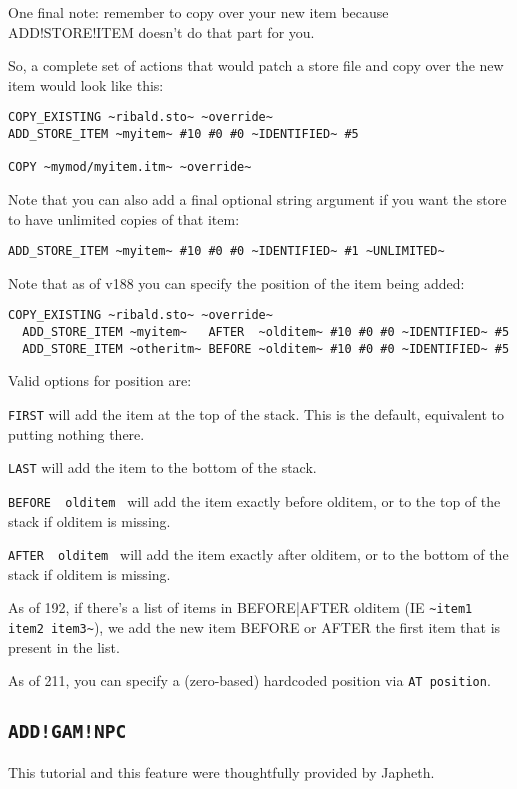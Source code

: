 \documentclass{article}
\def\DEFINE#1{{\tt \bf #1}\label{#1}\index{#1}}
\def\t#1{{\tt #1}}
\begin{document}
  One final note: remember to copy over your new item because
  ADD!STORE!ITEM doesn't do that part for you.

  So, a complete set of actions that would patch a store file and copy over
  the new item would look like this:

\begin{verbatim}
COPY_EXISTING ~ribald.sto~ ~override~
ADD_STORE_ITEM ~myitem~ #10 #0 #0 ~IDENTIFIED~ #5

COPY ~mymod/myitem.itm~ ~override~
\end{verbatim}

  Note that you can also add a final optional string argument if you want
  the store to have unlimited copies of that item:

\begin{verbatim}
ADD_STORE_ITEM ~myitem~ #10 #0 #0 ~IDENTIFIED~ #1 ~UNLIMITED~
\end{verbatim}

Note that as of v188 you can specify the position of the item being added:
\begin{verbatim}
COPY_EXISTING ~ribald.sto~ ~override~
  ADD_STORE_ITEM ~myitem~   AFTER  ~olditem~ #10 #0 #0 ~IDENTIFIED~ #5
  ADD_STORE_ITEM ~otheritm~ BEFORE ~olditem~ #10 #0 #0 ~IDENTIFIED~ #5
\end{verbatim}
  Valid options for position are:

  \t{FIRST} will add the item at the top of the stack.
     This is the default, equivalent to putting nothing there.

  \t{LAST} will add the item to the bottom of the stack.

  \t{BEFORE ~olditem~} will add the item exactly before olditem,
    or to the top of the stack if olditem is missing.

  \t{AFTER  ~olditem~} will add the item exactly after olditem,
    or to the bottom of the stack if olditem is missing.

As of 192, if there's a list of items in BEFORE|AFTER olditem (IE \verb+~item1 item2 item3~+),
we add the new item BEFORE or AFTER the first item that is present in the list.

As of 211, you can specify a (zero-based) hardcoded position via \verb+AT position+.

\subsection{\DEFINE{ADD!GAM!NPC}}
This tutorial and this feature were thoughtfully provided by Japheth.
\end{document}
